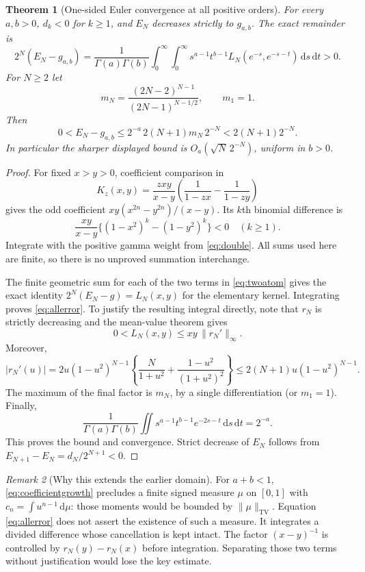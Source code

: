 \documentclass[11pt]{article}
\numberwithin{equation}{section}
\newtheorem{theorem}{Theorem}[section]
\theoremstyle{definition}\newtheorem{definition}[theorem]{Definition}
\theoremstyle{remark}\newtheorem{remark}[theorem]{Remark}
\newcommand{\dd}{\,\mathrm d}
\begin{document}
\begin{theorem}[One-sided Euler convergence at all positive orders]
\label{thm:allEuler}
For every $a,b>0$, $d_k<0$ for $k\ge1$, and $E_N$ decreases strictly
to $g_{a,b}$. The exact remainder is
\begin{equation}\label{eq:allerror}
 2^N(E_N-g_{a,b})
 =\frac1{\Gamma(a)\Gamma(b)}
 \int_0^\infty\!\int_0^\infty
 s^{a-1}t^{b-1}L_N(e^{-s},e^{-s-t})\dd s\dd t>0.
\end{equation}
For $N\ge2$ let
\[
 m_N=\frac{(2N-2)^{N-1}}{(2N-1)^{N-1/2}},\qquad m_1=1.
\]
Then
\begin{equation}\label{eq:allbound}
 0<E_N-g_{a,b}
 \le 2^{-a}\,2(N+1)m_N\,2^{-N}
 <2(N+1)2^{-N}.
\end{equation}
In particular the sharper displayed bound is $O_a(\sqrt N\,2^{-N})$,
uniform in $b>0$.
\end{theorem}
\begin{proof}
For fixed $x>y>0$, coefficient comparison in
\begin{equation}\label{eq:twoatom}
 K_z(x,y)=\frac{zxy}{x-y}
 \left(\frac1{1-zx}-\frac1{1-zy}\right)
\end{equation}
gives the odd coefficient $xy(x^{2n}-y^{2n})/(x-y)$.
Its $k$th binomial difference is
\[
 \frac{xy}{x-y}\{(1-x^2)^k-(1-y^2)^k\}<0\quad(k\ge1).
\]
Integrate with the positive gamma weight from \eqref{eq:double}.
All sums used here are finite, so there is no unproved summation
interchange.

The finite geometric sum for each of the two terms in
\eqref{eq:twoatom} gives the exact identity
$2^N(E_N-g)=L_N(x,y)$ for the elementary kernel. Integrating proves
\eqref{eq:allerror}. To justify the resulting integral directly, note
that $r_N$ is strictly decreasing and the mean-value theorem gives
\[
 0<L_N(x,y)\le xy\,\|r_N'\|_\infty.
\]
Moreover,
\begin{equation}\label{eq:rderivative}
 |r_N'(u)|
 =2u(1-u^2)^{N-1}
 \left\{\frac N{1+u^2}+\frac{1-u^2}{(1+u^2)^2}\right\}
 \le2(N+1)u(1-u^2)^{N-1}.
\end{equation}
The maximum of the final factor is $m_N$, by a single differentiation
(or $m_1=1$). Finally,
\[
 \frac1{\Gamma(a)\Gamma(b)}\iint
 s^{a-1}t^{b-1}e^{-2s-t}\dd s\dd t=2^{-a}.
\]
This proves the bound and convergence. Strict decrease of $E_N$ follows
from $E_{N+1}-E_N=d_N/2^{N+1}<0$.
\end{proof}

\begin{remark}[Why this extends the earlier domain]
For $a+b<1$, \eqref{eq:coefficientgrowth} precludes a finite signed
measure $\mu$ on $[0,1]$ with $c_n=\int u^{n-1}\dd\mu$: those moments
would be bounded by $\|\mu\|_{\mathrm{TV}}$. Equation
\eqref{eq:allerror} does not assert the existence of such a measure.
It integrates a divided difference whose cancellation is kept intact.
The factor $(x-y)^{-1}$ is controlled by $r_N(y)-r_N(x)$ before
integration. Separating those two terms without justification would
lose the key estimate.
\end{remark}
\end{document}
